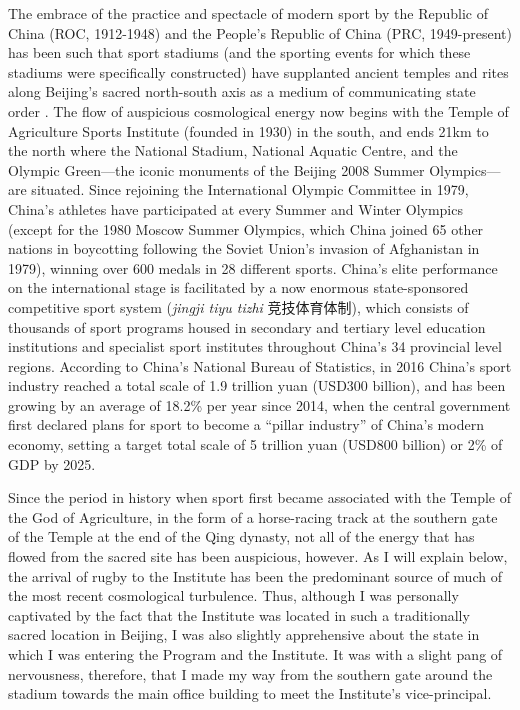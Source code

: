 The embrace of the practice and spectacle of modern sport by the Republic of China (ROC, 1912-1948) and the People's Republic of China (PRC, 1949-present) has been such that sport stadiums (and the sporting events for which these stadiums were specifically constructed) have supplanted ancient temples and rites along Beijing's sacred north-south axis as a medium of communicating state order \citep{Brownell1995}.  The flow of auspicious cosmological energy now begins with the Temple of Agriculture Sports Institute (founded in 1930) in the south, and ends 21km to the north where the National Stadium, National Aquatic Centre, and the Olympic Green---the iconic monuments of the Beijing 2008 Summer Olympics---are situated.  Since rejoining the International Olympic Committee in 1979, China's athletes have participated at every Summer and Winter Olympics (except for the 1980 Moscow Summer Olympics, which China joined 65 other nations in boycotting following the Soviet Union's invasion of Afghanistan in 1979), winning over 600 medals in 28 different sports.  China's elite performance on the international stage is facilitated by a now enormous state-sponsored competitive sport system (\textit{jingji tiyu tizhi} 竞技体育体制), which consists of thousands of sport programs housed in secondary and tertiary level education institutions and specialist sport institutes throughout China's 34 provincial level regions.  According to China's National Bureau of Statistics, in 2016 China's sport industry reached a total scale of 1.9 trillion yuan (USD300 billion), and has been growing by an average of 18.2\% per year since 2014, when the central government first declared plans for sport to become a ``pillar industry'' of China's modern economy, setting a target total scale of 5 trillion yuan (USD800 billion) or 2\% of GDP by 2025.

Since the period in history when sport first became associated with the Temple of the God of Agriculture, in the form of a horse-racing track at the southern gate of the Temple at the end of the Qing dynasty, not all of the energy that has flowed from the sacred site has been auspicious, however.  As I will explain below, the arrival of rugby to the Institute has been the predominant source of much of the most recent cosmological turbulence.  Thus, although I was personally captivated by the fact that the Institute was located in such a traditionally sacred location in Beijing, I was also slightly apprehensive about the state in which I was entering the Program and the Institute. It was with a slight pang of nervousness, therefore, that I made my way from the southern gate around the stadium towards the main office building to meet the Institute's vice-principal.

